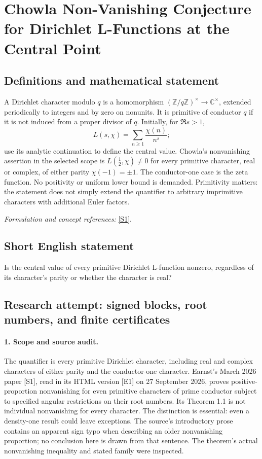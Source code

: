 \documentclass[11pt]{article}
\begin{document}
\section*{\texorpdfstring{Chowla Non-Vanishing Conjecture for Dirichlet L-Functions at the Central Point}{Chowla Non-Vanishing Conjecture for Dirichlet L-Functions at the Central Point}}\label{326}
\subsection{Definitions and mathematical statement}
A Dirichlet character modulo $q$ is a homomorphism $({\mathbb{Z}}/q{\mathbb{Z}})^\times\to{\mathbb{C}}^\times$, extended periodically to integers and by zero on nonunits. It is primitive of conductor $q$ if it is not induced from a proper divisor of $q$. Initially, for $\Re s>1$,
\[
 L(s,\chi)=\sum_{n\ge1}\frac{\chi(n)}{n^s};
\]
use its analytic continuation to define the central value. Chowla's nonvanishing assertion in the selected scope is $L(\tfrac12,\chi)\ne0$ for every primitive character, real or complex, of either parity $\chi(-1)=\pm1$. The conductor-one case is the zeta function. No positivity or uniform lower bound is demanded. Primitivity matters: the statement does not simply extend the quantifier to arbitrary imprimitive characters with additional Euler factors.
\par\smallskip\textit{Formulation and concept references:} \href{https://arxiv.org/pdf/2603.22124v1}{[S1]}.

\subsection{Short English statement}
Is the central value of every primitive Dirichlet L-function nonzero, regardless of its character's parity or whether the character is real?
\subsection{Research attempt: signed blocks, root numbers, and finite certificates}
\paragraph{1. Scope and source audit.}
The quantifier is every primitive Dirichlet character, including real and complex characters of either parity and the conductor-one character. Earnst's March 2026 paper [S1], read in its HTML version [E1] on 27 September 2026, proves positive-proportion nonvanishing for even primitive characters of prime conductor subject to specified angular restrictions on their root numbers. Its Theorem 1.1 is not individual nonvanishing for every character. The distinction is essential: even a density-one result could leave exceptions. The source's introductory prose contains an apparent sign typo when describing an older nonvanishing proportion; no conclusion here is drawn from that sentence. The theorem's actual nonvanishing inequality and stated family were inspected.
\end{document}

